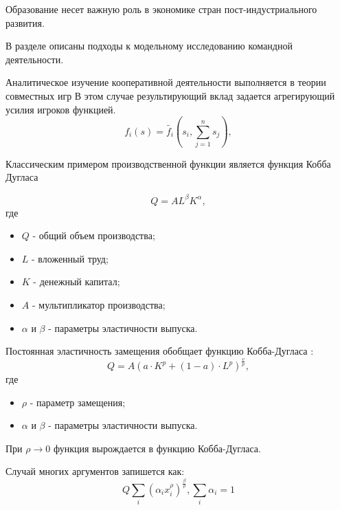 Образование несет важную роль в экономике стран пост-индустриального развития.

В разделе описаны подходы к модельному исследованию командной деятельности.

Аналитическое изучение кооперативной деятельности выполняется в теории совместных игр 
В этом случае результирующий вклад задается агрегирующий усилия игроков функцией.
$$
 f_i(s) = \tilde{f_i} \left(s_i, \sum_{j=1}^n s_j \right),
$$

Классическим примером производственной функции является функция Кобба Дугласа

$$
    Q = A L^\beta K^\alpha,
$$
где \begin{itemize}
    \item $Q$ - общий объем производства;
    \item $L$ - вложенный труд; 
    \item $K$ - денежный капитал;
    \item $A$ - мультипликатор производства;
    \item $\alpha$ и $\beta$ - параметры эластичности выпуска.
\end{itemize}


Постоянная эластичность замещения обобщает функцию 
Кобба-Дугласа \cite{mcfadden1963constant}:
$$
    Q = A (a \cdot K^p + (1-a)\cdot L^p)^{\frac{v}{p}},
$$
где \begin{itemize}
    \item $\rho$ - параметр замещения; 
    \item $\alpha$ и $\beta$ - параметры эластичности выпуска.
\end{itemize}

При $\rho \rightarrow 0$ функция вырождается в функцию Кобба-Дугласа.

Случай многих аргументов запишется как:
$$
    Q \sum_i \left(\alpha_i x_i^\rho \right)^{\frac{\beta}{\rho}}, \sum_i \alpha_i=1
$$




